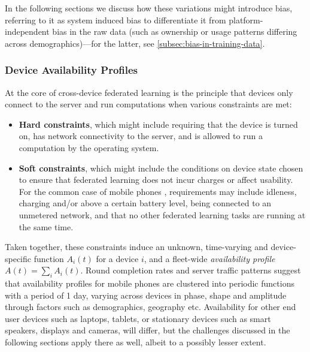 \documentclass[11pt]{article}
\begin{document}
In the following sections we discuss how these variations might introduce bias, referring to it as system induced bias to differentiate it from platform-independent bias in the raw data (such as ownership or usage patterns differing across demographics)---for the latter, see \cref{subsec:bias-in-training-data}.

\subsubsection{Device Availability Profiles}
At the core of cross-device federated learning is the principle that devices only connect to the server and run computations when various constraints are met:
\begin{itemize}
    \item \textbf{Hard constraints}, which might include requiring that the device is turned on, has network connectivity to the server, and is allowed to run a computation by the operating system.
    \item \textbf{Soft constraints}, which might include the conditions on device state chosen to ensure that federated learning does not incur charges or affect usability. For the common case of mobile phones \citep{bonawitz19sysml,apple19wwdc}, requirements may include idleness, charging and/or above a certain battery level, being connected to an unmetered network, and that no other federated learning tasks are running at the same time.
\end{itemize}

Taken together, these constraints induce an unknown, time-varying and device-specific function $A_i(t)$ for a device $i$, and a fleet-wide \textit{availability profile} $A(t)=\sum_i A_i (t)$. Round completion rates and server traffic patterns \citep{bonawitz19sysml, yang18gboardquery} suggest that availability profiles for mobile phones are clustered into periodic functions with a period of 1 day, varying across devices in phase, shape and amplitude through factors such as demographics, geography etc. Availability for other end user devices such as laptops, tablets, or stationary devices such as smart speakers, displays and cameras, will differ, but the challenges discussed in the following sections apply there as well, albeit to a possibly lesser extent.
\end{document}
